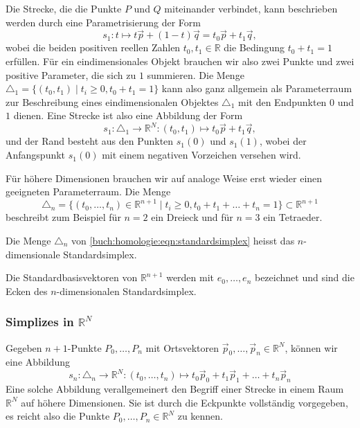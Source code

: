 Die Strecke, die die Punkte $P$ und $Q$ miteinander verbindet,
kann beschrieben werden durch eine Parametrisierung
der Form
\begin{equation}
s_1
\colon
t
\mapsto
t\vec{p} + (1-t) \vec{q}
=
t_0 \vec{p} + t_1\vec{q},
\end{equation}
wobei die beiden positiven reellen Zahlen $t_0,t_1\in\mathbb{R}$ die
Bedingung $t_0 + t_1 = 1$ erfüllen.
Für ein eindimensionales Objekt brauchen wir also zwei Punkte und zwei
positive Parameter, die sich zu $1$ summieren.
Die Menge $\triangle_1=\{ (t_0,t_1)\mid t_i\ge 0, t_0+t_1=1\}$ kann also
ganz allgemein als Parameterraum zur Beschreibung eines eindimensionalen Objektes
$\triangle_1$
mit den Endpunkten $0$ und $1$ dienen.
Eine Strecke ist also eine Abbildung der Form
\begin{equation}
s_1
\colon
\triangle_1 \to \mathbb{R}^N
:
(t_0,t_1)
\mapsto
t_0 \vec{p} + t_1\vec{q},
\end{equation}
und der Rand besteht aus den Punkten $s_1(0)$ und $s_1(1)$, wobei der
Anfangspunkt $s_1(0)$ mit einem negativen Vorzeichen versehen wird.

Für höhere Dimensionen brauchen wir auf analoge Weise erst wieder einen
geeigneten Parameterraum.
Die Menge
\begin{equation}
\triangle_n
=
\{(t_0,\dots,t_n)\in\mathbb{R}^{n+1}\mid t_i\ge 0,t_0+t_1+\dots+t_n=1\}
\subset\mathbb{R}^{n+1}
\label{buch:homologie:eqn:standardsimplex}
\end{equation}
beschreibt zum Beispiel für $n=2$ ein Dreieck und für $n=3$ ein 
Tetraeder.
%

\begin{definition}
Die Menge $\triangle_n$ von \eqref{buch:homologie:eqn:standardsimplex}
heisst das $n$-dimensionale Standardsimplex.
%
\end{definition}

Die Standardbasisvektoren von  $\mathbb{R}^{n+1}$ werden mit $e_0,\dots,e_n$
bezeichnet und sind die Ecken des $n$-dimensionalen Standardsimplex.

\subsubsection{Simplizes in $\mathbb{R}^N$}
Gegeben $n+1$-Punkte $P_0,\dots,P_n$ mit Ortsvektoren
$\vec{p}_0,\dots,\vec{p}_n\in\mathbb{R}^N$, können wir eine Abbildung
\begin{equation}
s_n
\colon
\triangle_n
\to
\mathbb{R}^N
:
(t_0,\dots,t_n)
\mapsto
t_0\vec{p}_0
+
t_1\vec{p}_1
+
\dots
+
t_n\vec{p}_n
\end{equation}
Eine solche Abbildung verallgemeinert den Begriff einer Strecke
in einem Raum $\mathbb{R}^N$  
auf höhere Dimensionen.
Sie ist durch die Eckpunkte vollständig vorgegeben, es reicht also
die Punkte $P_0,\dots,P_n\in\mathbb{R}^N$ zu kennen.

